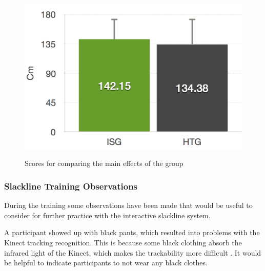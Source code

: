 \begin{figure}[htb]
\begin{minipage}[t]{0.40\linewidth}
		\label{fig:6_4_distanceLeftGroupEffect}
	\end{minipage}
	\hfill
	\begin{minipage}[t]{0.40\linewidth}
		\centering
		\includegraphics[width=1\linewidth]{Pictures/6_4_DIA_DistanceRightGroupEffect}
		\label{fig:6_4_distanceRightGroupEffect}
	\end{minipage}
	\caption{Scores for comparing the main effects of the group}
	\label{fig:6_4_mainEffectGroup}
\end{figure}

\subsubsection{Slackline Training Observations}\label{6_4_slacklineObservations}
During the training some observations have been made that would be useful to consider for further practice with the interactive slackline system.

A participant showed up with black pants, which resulted into problems with the Kinect tracking recognition.
This is because some black clothing absorb the infrared light of the Kinect, which makes the trackability more difficult \cite{KinectBlackClothing}.
It would be helpful to indicate participants to not wear any black clothes.

